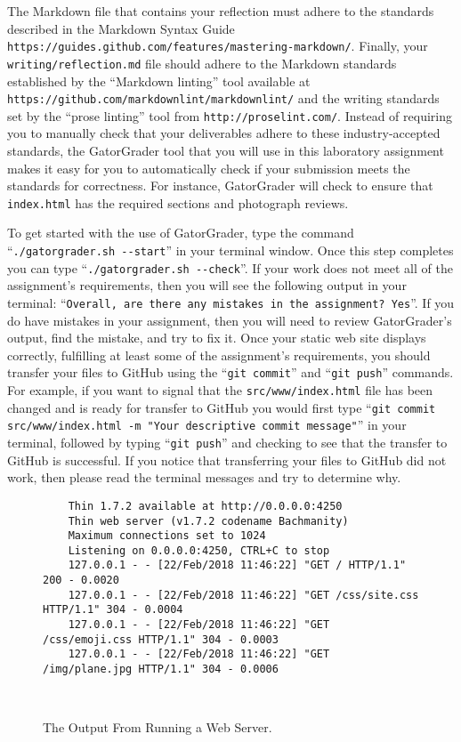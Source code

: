 \documentclass[11pt]{article}
\newcommand{\mainprogram}{\lstinline{index.html}}
\newcommand{\mainprogramsource}{\lstinline{src/www/index.html}}
\newcommand{\reflection}{\lstinline{writing/reflection.md}}
\newcommand{\gatorgraderstart}{\command{./gatorgrader.sh --start}}
\newcommand{\gatorgradercheck}{\command{./gatorgrader.sh --check}}
\newcommand{\gitcommit}{\command{git commit}}
\newcommand{\gitpush}{\command{git push}}
\newcommand{\gitcommitmainprogram}{\command{git commit src/www/index.html -m "Your
descriptive commit message"}}
\newcommand{\command}[1]{``\lstinline{#1}''}
\newcommand{\url}[1]{\lstinline{#1}}
\newcommand{\step}[1]{``{#1}''}
\begin{document}
The Markdown file that contains your reflection must adhere to the standards
described in the Markdown Syntax Guide
\url{https://guides.github.com/features/mastering-markdown/}. Finally, your
\reflection{} file should adhere to the Markdown standards established by the
\step{Markdown linting} tool available at
\url{https://github.com/markdownlint/markdownlint/} and the writing standards
set by the \step{prose linting} tool from \url{http://proselint.com/}. Instead
of requiring you to manually check that your deliverables adhere to these
industry-accepted standards, the GatorGrader tool that you will use in this
laboratory assignment makes it easy for you to automatically check if your
submission meets the standards for correctness. For instance, GatorGrader will
check to ensure that \mainprogram{} has the required sections and photograph
reviews.

To get started with the use of GatorGrader, type the command \gatorgraderstart{}
in your terminal window. Once this step completes you can type
\gatorgradercheck{}. If your work does not meet all of the assignment's
requirements, then you will see the following output in your terminal:
\command{Overall, are there any mistakes in the assignment? Yes}. If you do have
mistakes in your assignment, then you will need to review GatorGrader's output,
find the mistake, and try to fix it. Once your static web site displays
correctly, fulfilling at least some of the assignment's requirements, you should
transfer your files to GitHub using the \gitcommit{} and \gitpush{} commands.
For example, if you want to signal that the \mainprogramsource{} file has been
changed and is ready for transfer to GitHub you would first type
\gitcommitmainprogram{} in your terminal, followed by typing \gitpush{} and
checking to see that the transfer to GitHub is successful. If you notice that
transferring your files to GitHub did not work, then please read the terminal
messages and try to determine why.

\begin{figure}[t]
  \centering
  \begin{verbatim}
    Thin 1.7.2 available at http://0.0.0.0:4250
    Thin web server (v1.7.2 codename Bachmanity)
    Maximum connections set to 1024
    Listening on 0.0.0.0:4250, CTRL+C to stop
    127.0.0.1 - - [22/Feb/2018 11:46:22] "GET / HTTP/1.1" 200 - 0.0020
    127.0.0.1 - - [22/Feb/2018 11:46:22] "GET /css/site.css HTTP/1.1" 304 - 0.0004
    127.0.0.1 - - [22/Feb/2018 11:46:22] "GET /css/emoji.css HTTP/1.1" 304 - 0.0003
    127.0.0.1 - - [22/Feb/2018 11:46:22] "GET /img/plane.jpg HTTP/1.1" 304 - 0.0006
  \end{verbatim}
  \vspace*{-.35in}
  \caption{The Output From Running a Web Server.}~\label{fig:output}
  \vspace*{-.25in}
\end{figure}
\end{document}
